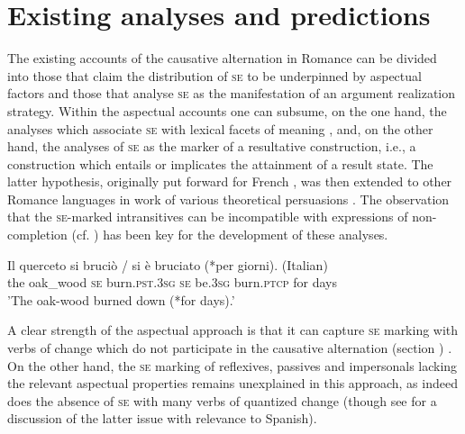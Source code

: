 \documentclass[output=paper,colorlinks,citecolor=brown
]{langscibook}
\begin{document}
\section{Existing analyses and predictions}
\label{bentley_section_2}
The existing accounts of the causative alternation in Romance can be divided into those that claim the distribution of \textsc{se} to be underpinned by aspectual factors and those that analyse \textsc{se} as the manifestation of an argument realization strategy. Within the aspectual accounts one can subsume, on the one hand, the analyses which associate \textsc{se} with lexical facets of meaning \citep{cennamo2012aspectual,cennamo2015valency,cennamo2021anticausatives,vivanco2021scalar}, and, on the other hand, the analyses of \textsc{se} as the marker of a resultative construction, i.e., a construction which entails or implicates the attainment of a result state. The latter hypothesis, originally put forward for French \citep{zribi1987reflexivite}, was then extended to other Romance languages in work of various theoretical persuasions \citep{jezek2003classi,folli2002constructing,folli2005consuming,manente2008laspect,labelle2010anticausative,cennamo2011anticausative,cennamo2012aspectual}. The observation that the \textsc{se}-marked intransitives can be incompatible with expressions of non-completion (cf. ) has been key for the development of these analyses.

\ea  \label{bentley_example_2}
\gll
Il querceto si bruciò / si è bruciato {(*per giorni)}. (Italian) \\
the	oak\_wood \textsc{se} burn.\textsc{pst}.3\textsc{sg} {} \textsc{se} be.3\textsc{sg} burn.\textsc{ptcp} {for days} {} \\
\glt
'The oak-wood burned down (*for days).’ \\
\citep[401]{cennamo2012aspectual}
\z

A clear strength of the aspectual approach is that it can capture \textsc{se} marking with verbs of change which do not participate in the causative alternation (section ) \citep{miguel2000operador,acedomatellan2022argument}. On the other hand, the \textsc{se} marking of reflexives, passives and impersonals lacking the relevant aspectual properties remains unexplained in this approach, as indeed does the absence of \textsc{se} with many verbs of quantized change (though see \cite{vivanco2021scalar} for a discussion of the latter issue with relevance to Spanish).
\end{document}
